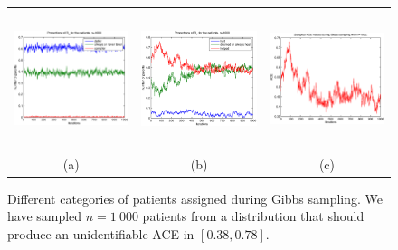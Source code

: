 \documentclass[a4paper, 10pt]{article}
\begin{document}
\begin{figure}
\begin{tabular}{ccc}
 \includegraphics[width=4.5cm,height=4cm,bb=103 240 500
555]{takingtype_case0.38_0.78_n=1000.eps} &
 \includegraphics[width=4.5cm,height=4cm,bb=103 240 500 555]
{healingtype_case0.38_0.78_n=1000.eps} &
 \includegraphics[width=4.5cm,height=4cm,bb=103 240
500 555]{sampledACEs_case0.38_0.78_n=1000.eps} \\
(a) & (b) & (c)
\end{tabular}
\caption{Different categories of patients assigned during Gibbs sampling. We
have sampled $n=1\ 000$ patients from a distribution that should produce an
unidentifiable ACE in $[0.38, 0.78]$.}
\label{fig:n=1000_case0.38_0.78}
\end{figure}
\end{document}
